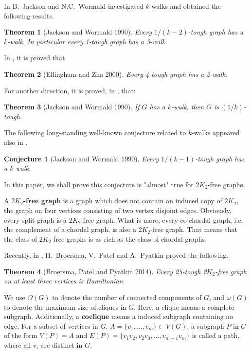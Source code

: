 \documentclass[12pt]{article}
\newtheorem{theorem}{Theorem}
\newtheorem{conjecture}{Conjecture}
\begin{document}
In \cite{jackson1990k} B.~Jackson and N.C.~Wormald investigated $k$-walks and obtained the following results.
\begin{theorem}[Jackson and Wormald 1990]\label{cthm1}
Every $1/(k-2)$-tough graph has a $k$-walk. 
In particular every 1-tough graph has a 3-walk. 
\end{theorem}

In \cite{ellingham2000toughness}, it is proved that
\begin{theorem}[Ellingham and Zha 2000]\label{cthm3}
Every 4-tough graph has a 2-walk.
\end{theorem}
For another direction, it is proved, in \cite{jackson1990k}, that:
\begin{theorem}[Jackson and Wormald 1990]\label{add}
If $G$ has a $k$-walk, then $G$ is $(1/k)$-tough.
\end{theorem}


The following long-standing well-known conjecture related to $k$-walks appeared also in \cite{jackson1990k}.
\begin{conjecture}[Jackson and Wormald 1990]\label{conj2}
Every $1/(k-1)$-tough graph has a $k$-walk.
\end{conjecture}



In this paper, we shall prove this conjecture is "almost" true for $2K_2$-free graphs.





A {\bf $2K_2$-free graph} is a graph which does not contain an induced copy of $2K_2$, the graph on four vertices consisting of two vertex disjoint edges.
 Obviously, every split graph is a $2K_2$-free graph. What is more, every co-chordal graph, i.e. the complement of a chordal graph, is also a $2K_2$-free graph. That means that the class of $2K_2$-free graphs is as rich as the class of chordal graphs.

Recently, in \cite{broersma2014toughness}, H.~Broersma, V.~Patel and A.~Pyatkin proved the following. 
\begin{theorem}[Broersma, Patel and Pyatkin 2014]\label{cthm6}
Every 25-tough 2$K_2$-free graph on at least three vertices is Hamiltonian.
\end{theorem}

We use $\Omega(G)$ to denote the number of connected components of $G$, and $\omega(G)$ to denote the maximum size of cliques in $G$. Here, a clique means a complete subgraph. Additionally, a {\bf coclique} means a induced subgraph containing no edge. For a subset of vertices in $G$, $A=\{v_1,\ldots,v_m\}\subset V(G)$, a subgraph $P$ in $G$ of the form $V(P)=A$ and $E(P)=\{v_1v_2,v_2v_3,\ldots,v_{m-1}v_m\}$ is called a path, where all $v_i$ are distinct in $G$.
\end{document}
